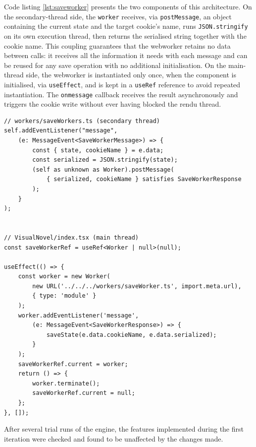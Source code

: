 Code listing \ref{lst:saveworker} presents the two components of this architecture. On the secondary-thread side, the \texttt{worker} receives, via \texttt{postMessage}, an object containing the current state and the target cookie's name, runs \texttt{JSON.stringify} on its own execution thread, then returns the serialised string together with the cookie name. This coupling guarantees that the \gls{webworker} retains no data between calls: it receives all the information it needs with each message and can be reused for any save operation with no additional initialisation. On the main-thread side, the \gls{webworker} is instantiated only once, when the component is initialised, via \texttt{useEffect}, and is kept in a \texttt{useRef} reference to avoid repeated instantiation. The \texttt{onmessage} callback receives the result asynchronously and triggers the cookie write without ever having blocked the \gls{rendu} thread.

\begin{listing}[H]
\begin{verbatim}
// workers/saveWorkers.ts (secondary thread)
self.addEventListener("message",
    (e: MessageEvent<SaveWorkerMessage>) => {
        const { state, cookieName } = e.data;
        const serialized = JSON.stringify(state);
        (self as unknown as Worker).postMessage(
            { serialized, cookieName } satisfies SaveWorkerResponse
        );
    }
);


// VisualNovel/index.tsx (main thread)
const saveWorkerRef = useRef<Worker | null>(null);

useEffect(() => {
    const worker = new Worker(
        new URL('../../../workers/saveWorker.ts', import.meta.url),
        { type: 'module' }
    );
    worker.addEventListener('message',
        (e: MessageEvent<SaveWorkerResponse>) => {
            saveState(e.data.cookieName, e.data.serialized);
        }
    );
    saveWorkerRef.current = worker;
    return () => {
        worker.terminate();
        saveWorkerRef.current = null;
    };
}, []);
\end{verbatim}
\caption{Implementation of \texttt{saveWorker}: communication protocol between the main thread and the secondary thread (Author 2026)}
\label{lst:saveworker}
\end{listing}

\clearpage



After several trial runs of the engine, the features implemented during the first iteration were checked and found to be unaffected by the changes made.

